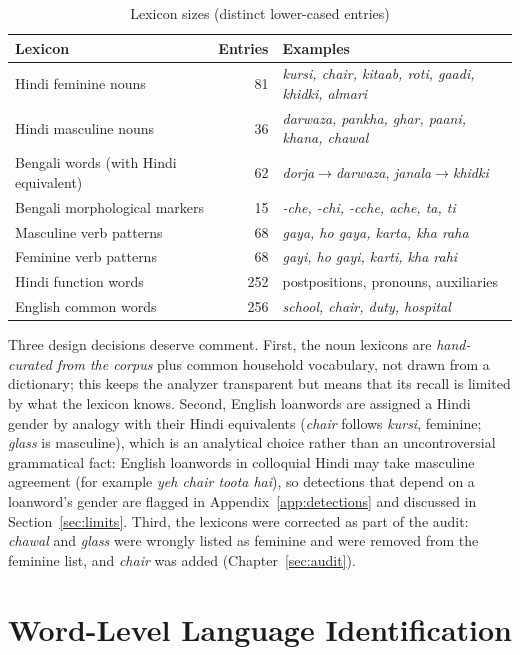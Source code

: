 \documentclass[11pt,a4paper]{report}
\begin{document}
\begin{table}[H]
\centering
\caption{Lexicon sizes (distinct lower-cased entries)}
\label{tab:lex}
\small
\begin{tabular}{p{2.1in}rp{2.5in}}
\toprule
\textbf{Lexicon} & \textbf{Entries} & \textbf{Examples} \\
\midrule
Hindi feminine nouns & 81 & \textit{kursi, chair, kitaab, roti, gaadi, khidki, almari} \\
Hindi masculine nouns & 36 & \textit{darwaza, pankha, ghar, paani, khana, chawal} \\
Bengali words (with Hindi equivalent) & 62 & \textit{dorja}$\to$\textit{darwaza}, \textit{janala}$\to$\textit{khidki} \\
Bengali morphological markers & 15 & \textit{-che, -chi, -cche, ache, ta, ti} \\
Masculine verb patterns & 68 & \textit{gaya, ho gaya, karta, kha raha} \\
Feminine verb patterns & 68 & \textit{gayi, ho gayi, karti, kha rahi} \\
Hindi function words & 252 & postpositions, pronouns, auxiliaries \\
English common words & 256 & \textit{school, chair, duty, hospital} \\
\bottomrule
\end{tabular}
\end{table}

Three design decisions deserve comment. First, the noun lexicons are \emph{hand-curated from the corpus} plus common household vocabulary, not drawn from a dictionary; this keeps the analyzer transparent but means that its recall is limited by what the lexicon knows. Second, English loanwords are assigned a Hindi gender by analogy with their Hindi equivalents (\textit{chair} follows \textit{kursi}, feminine; \textit{glass} is masculine), which is an analytical choice rather than an uncontroversial grammatical fact: English loanwords in colloquial Hindi may take masculine agreement (for example \textit{yeh chair toota hai}), so detections that depend on a loanword's gender are flagged in Appendix~\ref{app:detections} and discussed in Section~\ref{sec:limits}. Third, the lexicons were corrected as part of the audit: \textit{chawal} and \textit{glass} were wrongly listed as feminine and were removed from the feminine list, and \textit{chair} was added (Chapter~\ref{sec:audit}).

\section{Word-Level Language Identification}
\end{document}
